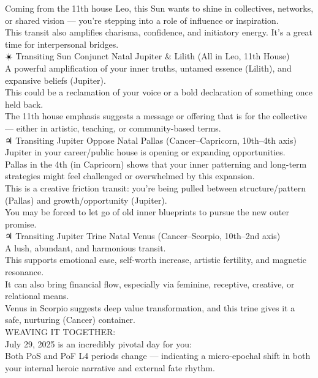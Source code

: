 \documentclass{article}
\begin{document}
Coming from the 11th house Leo, this Sun wants to shine in collectives, networks, or shared vision --- you're stepping into a role of influence or inspiration.\\
This transit also amplifies charisma, confidence, and initiatory energy. It's a great time for interpersonal bridges.\\
☀️ Transiting Sun Conjunct Natal Jupiter \& Lilith (All in Leo, 11th House)\\
A powerful amplification of your inner truths, untamed essence (Lilith), and expansive beliefs (Jupiter).\\
This could be a reclamation of your voice or a bold declaration of something once held back.\\
The 11th house emphasis suggests a message or offering that is for the collective --- either in artistic, teaching, or community-based terms.\\
♃ Transiting Jupiter Oppose Natal Pallas (Cancer--Capricorn, 10th--4th axis)\\
Jupiter in your career/public house is opening or expanding opportunities.\\
Pallas in the 4th (in Capricorn) shows that your inner patterning and long-term strategies might feel challenged or overwhelmed by this expansion.\\
This is a creative friction transit: you're being pulled between structure/pattern (Pallas) and growth/opportunity (Jupiter).\\
You may be forced to let go of old inner blueprints to pursue the new outer promise.\\
♃ Transiting Jupiter Trine Natal Venus (Cancer--Scorpio, 10th--2nd axis)\\
A lush, abundant, and harmonious transit.\\
This supports emotional ease, self-worth increase, artistic fertility, and magnetic resonance.\\
It can also bring financial flow, especially via feminine, receptive, creative, or relational means.\\
Venus in Scorpio suggests deep value transformation, and this trine gives it a safe, nurturing (Cancer) container.\\
WEAVING IT TOGETHER:\\
July 29, 2025 is an incredibly pivotal day for you:\\
Both PoS and PoF L4 periods change --- indicating a micro-epochal shift in both your internal heroic narrative and external fate rhythm.\\
\end{document}
